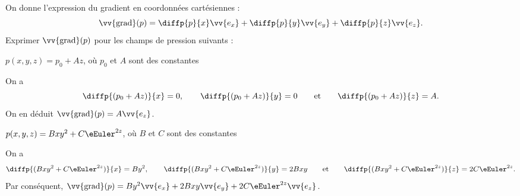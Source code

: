 On donne l'expression du gradient en coordonnées cartésiennes : 
\[
\vv{\text{grad}}(p)=\diffp{p}{x}\vv{e_x}+\diffp{p}{y}\vv{e_y}+\diffp{p}{z}\vv{e_z}.
\]
Exprimer $\vv{\text{grad}}(p)$ pour les champs de pression suivants :
\debutEntrainement




\begin{enonce}
$p(x,y,z)=p_0+Az$, où $p_0$ et $A$ sont des constantes
\end{enonce}


\begin{corrige}
On a 
\[
\diffp{(p_0+Az)}{x}=0,
\qquad
\diffp{(p_0+Az)}{y}=0
\qquad\text{et}\qquad
\diffp{(p_0+Az)}{z}=A.
\]
On en déduit $\vv{\text{grad}}(p)=A\vv{e_z}$.
\end{corrige}






\begin{enonce}
$p(x,y,z)=Bxy^2+C\eEuler^{2z}$, où $B$ et $C$ sont des constantes
\end{enonce}


\begin{corrige}
On a 
\[
\diffp{(Bxy^2+C\eEuler^{2z})}{x}=By^2,
\qquad
\diffp{(Bxy^2+C\eEuler^{2z})}{y}=2Bxy
\qquad\text{et}\qquad
\diffp{(Bxy^2+C\eEuler^{2z})}{z}=2C\eEuler^{2z}.
\]
Par conséquent, $\vv{\text{grad}}(p)=By^2\vv{e_x}+2Bxy\vv{e_y}+2C\eEuler^{2z}\vv{e_z}$.
\end{corrige}



\finEntrainement







